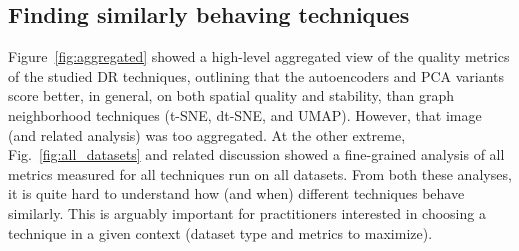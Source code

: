 



\subsection{Finding similarly behaving techniques}
\label{sec:choice}
%
Figure~\ref{fig:aggregated} showed a high-level aggregated view of the quality metrics of the studied DR techniques, outlining that the autoencoders and PCA variants score better, in general, on both spatial quality and stability, than graph neighborhood techniques (t-SNE, dt-SNE, and UMAP). However, that image (and related analysis) was too aggregated. At the other extreme, Fig.~\ref{fig:all_datasets} and related discussion showed a fine-grained analysis of all metrics measured for all techniques run on all datasets. From both these analyses, it is quite hard to understand how (and when) different techniques behave similarly. This is arguably important for practitioners interested in choosing a technique in a given context (dataset type and metrics to maximize).


